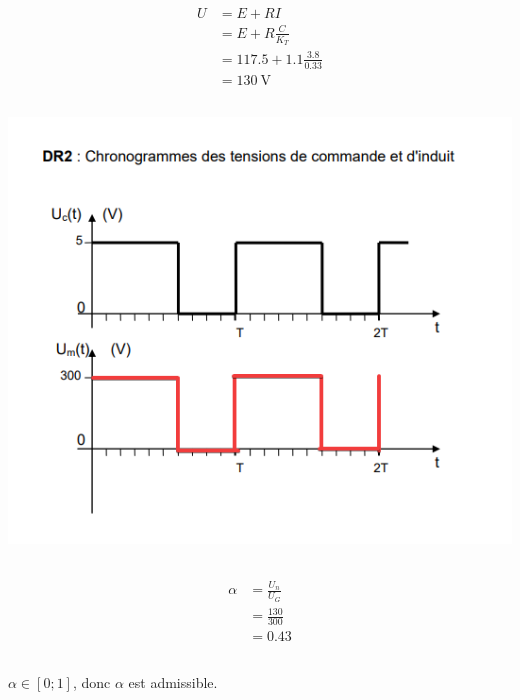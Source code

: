 \documentclass{article}
\begin{document}
\subsection{}

\begin{equation*}
  \begin{split}
    U &= E + RI \\
      &= E + R\frac{C}{K_T} \\
      &= 117.5 + 1.1\frac{3.8}{0.33} \\
      &= \SI{130}{\volt}
  \end{split}
\end{equation*}

\subsection{}

\includegraphics{dr2.png}

\subsection{}

\begin{equation*}
  \begin{split}
    \alpha &= \frac{U_n}{U_G} \\
           &= \frac{130}{300} \\
           &= 0.43
  \end{split}
\end{equation*}

\subsection{}

$\alpha \in [0; 1]$, donc $\alpha$ est admissible.
\end{document}
